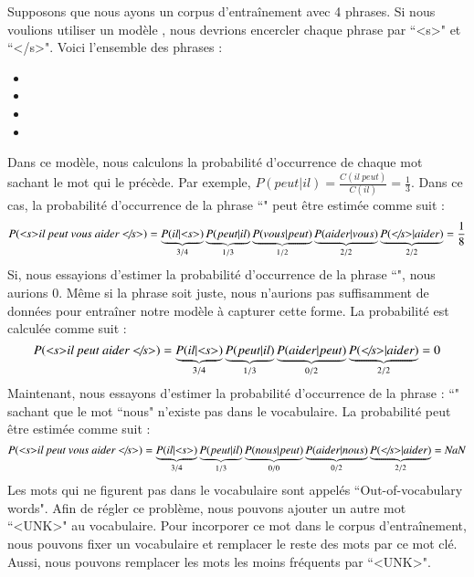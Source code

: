 \documentclass{KodeBook}
\begin{document}
Supposons que nous ayons un corpus d'entraînement avec 4 phrases. 
Si nous voulions utiliser un modèle , nous devrions encercler chaque phrase par ``\textless s\textgreater" et ``\textless/s\textgreater".
Voici l'ensemble des phrases :
\begin{itemize}
	\item {}
	\item {}
	\item {}
	\item {}
\end{itemize}
%
Dans ce modèle, nous calculons la probabilité d'occurrence de chaque mot sachant le mot qui le précède. 
Par exemple, $P(peut | il) = \frac{C(il\ peut)}{C(il)} = \frac{1}{3}$.
Dans ce cas, la probabilité d'occurrence de la phrase ``" peut être estimée comme suit :
\[
P(\text{\textit{\textless s\textgreater il peut vous aider \textless/s\textgreater}}) = 
\underbrace{P(il|\text{\textit{\textless s\textgreater}})}_{3/4}
\underbrace{P(peut|il)}_{1/3} 
\underbrace{P(vous|peut)}_{1/2} 
\underbrace{P(aider|vous)}_{2/2}
\underbrace{P(\text{\textit{\textless/s\textgreater}}|aider)}_{2/2} = 
\frac{1}{8}
\]
%
Si, nous essayions d'estimer la probabilité d'occurrence de la phrase ``", nous aurions $0$. 
Même si la phrase soit juste, nous n'aurions pas suffisamment de données pour entraîner notre modèle à capturer cette forme. 
La probabilité est calculée comme suit : 
\[
P(\text{\textit{\textless s\textgreater il peut aider \textless/s\textgreater}}) = 
\underbrace{P(il|\text{\textit{\textless s\textgreater}})}_{3/4}
\underbrace{P(peut|il)}_{1/3} 
\underbrace{P(aider|peut)}_{0/2}
\underbrace{P(\text{\textit{\textless/s\textgreater}}|aider)}_{2/2} = 
0
\]
%
Maintenant, nous essayons d'estimer la probabilité d'occurrence de la phrase : 
``" sachant que le mot ``nous" n'existe pas dans le vocabulaire. 
La probabilité peut être estimée comme suit : 
\[
P(\text{\textit{\textless s\textgreater il peut vous aider \textless/s\textgreater}}) = 
\underbrace{P(il|\text{\textit{\textless s\textgreater}})}_{3/4}
\underbrace{P(peut|il)}_{1/3} 
\underbrace{P(nous|peut)}_{0/0} 
\underbrace{P(aider|nous)}_{0/2}
\underbrace{P(\text{\textit{\textless/s\textgreater}}|aider)}_{2/2} = 
\text{\textit{NaN}}
\]
Les mots qui ne figurent pas dans le vocabulaire sont appelés ``Out-of-vocabulary words". 
Afin de régler ce problème, nous pouvons ajouter un autre mot ``\textless UNK\textgreater" au vocabulaire. 
Pour incorporer ce mot dans le corpus d'entraînement, nous pouvons fixer un vocabulaire et remplacer le reste des mots par ce mot clé.
Aussi, nous pouvons remplacer les mots les moins fréquents par ``\textless UNK\textgreater". 
\end{document}
